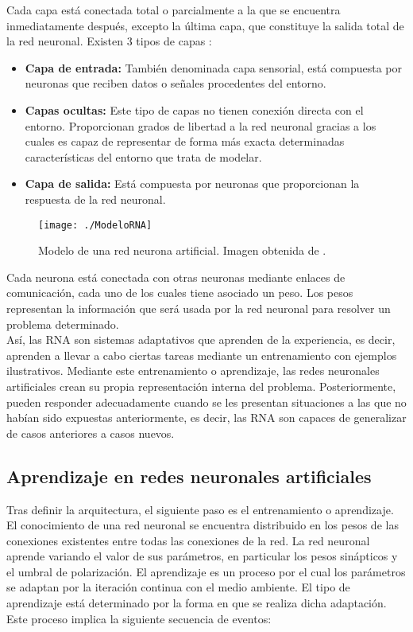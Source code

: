 \documentclass[a4paper, 12pt, spanish, chapterprefix, numbers=noenddot]{book}
\begin{document}
Cada capa está conectada total o parcialmente a la que se encuentra inmediatamente después, excepto la última capa, que constituye la salida total de la red neuronal. Existen 3 tipos de capas \cite{TiposCapasRNA}:

\begin{itemize}
\item \textbf{Capa de entrada:} También denominada capa sensorial, está compuesta por neuronas que reciben datos o señales procedentes del entorno.
\item \textbf{Capas ocultas:} Este tipo de capas no tienen conexión directa con el entorno. Proporcionan grados de libertad a la red neuronal gracias a los cuales es capaz de representar de forma más exacta determinadas características del entorno que trata de modelar.
\item \textbf{Capa de salida:} Está compuesta por neuronas que proporcionan la respuesta de la red neuronal.
\end{itemize}

\begin{figure}[H]
\begin{center}
\texttt{[image: ./ModeloRNA]}
\caption{Modelo de una red neurona artificial. Imagen obtenida de \cite{CapasRNA}.}
\label{ModeloRNA}
\end{center}
\end{figure}

Cada neurona está conectada con otras neuronas mediante enlaces de comunicación, cada uno de los cuales tiene asociado un peso. Los pesos representan la información que será usada por la red neuronal para resolver un problema determinado.\\

Así, las RNA son sistemas adaptativos que aprenden de la experiencia, es decir, aprenden a llevar a cabo ciertas tareas mediante un entrenamiento con ejemplos ilustrativos. Mediante este entrenamiento o aprendizaje, las redes neuronales artificiales crean su propia representación interna del problema. Posteriormente, pueden responder adecuadamente cuando se les presentan situaciones a las que no habían sido expuestas anteriormente, es decir, las RNA son capaces de generalizar de casos anteriores a casos nuevos.

\subsection{Aprendizaje en redes neuronales artificiales}

Tras definir la arquitectura, el siguiente paso es el entrenamiento o aprendizaje. El conocimiento de una red neuronal se encuentra distribuido en los pesos de las conexiones existentes entre todas las conexiones de la red. La red neuronal aprende variando el valor de sus parámetros, en particular los pesos sinápticos y el umbral de polarización. El aprendizaje es un proceso por el cual los parámetros se adaptan por la iteración continua con el medio ambiente. El tipo de aprendizaje está determinado por la forma en que se realiza dicha adaptación. Este proceso implica la siguiente secuencia de eventos:
\end{document}
